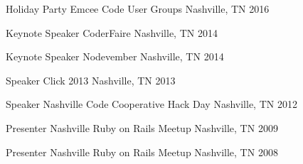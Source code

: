 
\begin{cvpublicspeakings}
  \cvpublicspeaking
  {Holiday Party Emcee}
  {Code User Groups}
  {Nashville, TN}
  {2016}

  \cvpublicspeaking
  {Keynote Speaker}
  {CoderFaire}
  {Nashville, TN}
  {2014}

  \cvpublicspeaking
  {Keynote Speaker}
  {Nodevember}
  {Nashville, TN}
  {2014}

  \cvpublicspeaking
  {Speaker}
  {Click 2013}
  {Nashville, TN}
  {2013}

  \cvpublicspeaking
  {Speaker}
  {Nashville Code Cooperative Hack Day}
  {Nashville, TN}
  {2012}

  \cvpublicspeaking
  {Presenter}
  {Nashville Ruby on Rails Meetup}
  {Nashville, TN}
  {2009}

  \cvpublicspeaking
  {Presenter}
  {Nashville Ruby on Rails Meetup}
  {Nashville, TN}
  {2008}

\end{cvpublicspeakings}
